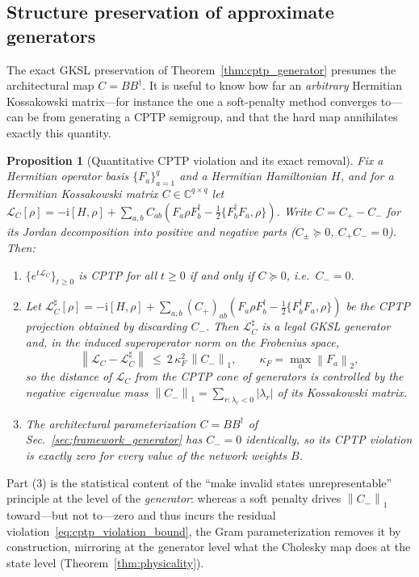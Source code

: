 \documentclass[twocolumn,aps,prxquantum,superscriptaddress,nofootinbib,floatfix,longbibliography]{revtex4-2}
\newtheorem{proposition}[theorem]{Proposition}
\newcommand{\C}{\mathbb{C}}
\newcommand{\calL}{\mathcal{L}}
\newcommand{\ii}{\mathrm{i}}
\newcommand{\norm}[1]{\left\lVert #1 \right\rVert}
\newcommand{\abs}[1]{\left\lvert #1 \right\rvert}
\begin{document}
\subsection{Structure preservation of approximate generators}
\label{sec:surrogate_cptp}

The exact GKSL preservation of Theorem~\ref{thm:cptp_generator} presumes the architectural map $C=BB^\dagger$. It is useful to know how far an \emph{arbitrary} Hermitian Kossakowski matrix---for instance the one a soft-penalty method converges to---can be from generating a CPTP semigroup, and that the hard map annihilates exactly this quantity.

\begin{proposition}[Quantitative CPTP violation and its exact removal]
\label{prop:cptp_violation}
Fix a Hermitian operator basis $\{F_a\}_{a=1}^{q}$ and a Hermitian Hamiltonian $H$, and for a Hermitian Kossakowski matrix $C\in\C^{q\times q}$ let $\calL_C[\rho]=-\ii[H,\rho]+\sum_{a,b}C_{ab}(F_a\rho F_b^\dagger-\tfrac12\{F_b^\dagger F_a,\rho\})$. Write $C=C_+-C_-$ for its Jordan decomposition into positive and negative parts ($C_\pm\succeq0$, $C_+C_-=0$). Then:
\begin{enumerate}[leftmargin=1.6em]
\item $\{e^{t\calL_C}\}_{t\ge0}$ is CPTP for all $t\ge0$ if and only if $C\succeq0$, i.e.\ $C_-=0$.
\item Let $\calL_C^\sharp[\rho]=-\ii[H,\rho]+\sum_{a,b}(C_+)_{ab}(F_a\rho F_b^\dagger-\tfrac12\{F_b^\dagger F_a,\rho\})$ be the CPTP projection obtained by discarding $C_-$. Then $\calL_C^\sharp$ is a legal GKSL generator and, in the induced superoperator norm on the Frobenius space,
\begin{equation}
\norm{\calL_C-\calL_C^\sharp}\ \le\ 2\,\kappa_F^2\,\norm{C_-}_1,
\qquad
\kappa_F=\max_a\norm{F_a}_2,
\label{eq:cptp_violation_bound}
\end{equation}
so the distance of $\calL_C$ from the CPTP cone of generators is controlled by the negative eigenvalue mass $\norm{C_-}_1=\sum_{r:\lambda_r<0}\abs{\lambda_r}$ of its Kossakowski matrix.
\item The architectural parameterization $C=B B^\dagger$ of Sec.~\ref{sec:framework_generator} has $C_-=0$ identically, so its CPTP violation is exactly zero for every value of the network weights $B$.
\end{enumerate}
\end{proposition}

Part (3) is the statistical content of the ``make invalid states unrepresentable'' principle at the level of the \emph{generator}: whereas a soft penalty drives $\norm{C_-}_1$ toward---but not to---zero and thus incurs the residual violation~\eqref{eq:cptp_violation_bound}, the Gram parameterization removes it by construction, mirroring at the generator level what the Cholesky map does at the state level (Theorem~\ref{thm:physicality}).
\end{document}
